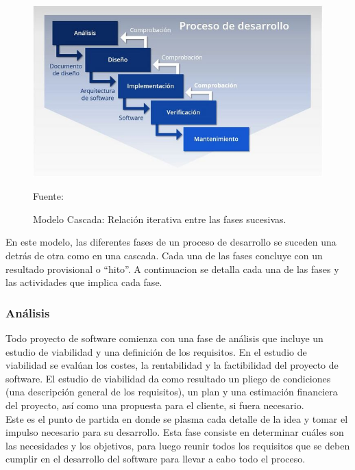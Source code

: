 \begin{figure}[H]
    \begin{center}
        \includegraphics[width=12cm]{img/capitulo_2/waterfall.jpeg}
    \end{center}
    \begin{center}
        \caption{Modelo Cascada: Relación iterativa entre las fases sucesivas.}
        Fuente: \cite{blog:modelocascada}
        \label{fig:cascada_iterativa}    
    \end{center}
\end{figure}

En este modelo, las diferentes fases de un proceso de desarrollo se suceden una detrás de otra como en una cascada. Cada una de las fases concluye con un resultado provisional o ``hito''. A continuacion se detalla cada una de las fases y las actividades que implica cada fase.\\

\subsubsection{Análisis}

Todo proyecto de software comienza con una fase de análisis que incluye un estudio de viabilidad y una definición de los requisitos. En el estudio de viabilidad se evalúan los costes, la rentabilidad y la factibilidad del proyecto de software. El estudio de viabilidad da como resultado un pliego de condiciones (una descripción general de los requisitos), un plan y una estimación financiera del proyecto, así como una propuesta para el cliente, si fuera necesario.\\

Este es el punto de partida en donde se plasma cada detalle de la idea y tomar el impulso necesario para su desarrollo. Esta fase consiste en determinar cuáles son las necesidades y los objetivos, para luego reunir todos los requisitos que se deben cumplir en el desarrollo del software para llevar a cabo todo el proceso.\\

